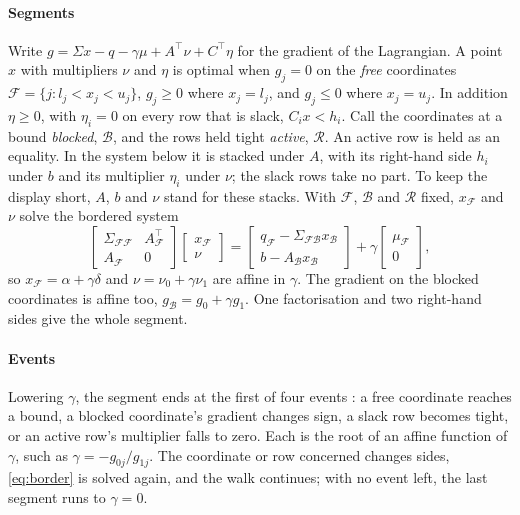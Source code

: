\documentclass[11pt]{article}
\theoremstyle{remark}
\newcommand{\trans}{^{\top}}
\newcommand{\Sig}{\Sigma}
\newcommand{\F}{\mathcal{F}}
\newcommand{\B}{\mathcal{B}}
\begin{document}
\paragraph{Segments} Write
$g=\Sig x-q-\gamma\mu+A\trans\nu+C\trans\eta$ for the gradient of the Lagrangian. A point
$x$ with multipliers $\nu$ and $\eta$ is optimal when $g_j=0$ on the \emph{free}
coordinates $\F=\{j:l_j<x_j<u_j\}$, $g_j\ge0$ where $x_j=l_j$, and $g_j\le0$ where
$x_j=u_j$. In addition $\eta\ge0$, with $\eta_i=0$ on every row that is slack,
$C_ix<h_i$. Call the coordinates at a bound \emph{blocked}, $\B$, and the rows held
tight \emph{active}, $\mathcal{R}$. An active row is held as an equality. In the system
below it is stacked under $A$, with its right-hand side $h_i$ under $b$ and its
multiplier $\eta_i$ under $\nu$; the slack rows take no part. To keep the display short, $A$,
$b$ and $\nu$ stand for these stacks. With $\F$, $\B$ and $\mathcal{R}$ fixed, $x_\F$
and $\nu$ solve the bordered system
\begin{equation}
\label{eq:border}
\begin{bmatrix}\Sig_{\F\F}&A_\F\trans\\A_\F&0\end{bmatrix}
\begin{bmatrix}x_\F\\\nu\end{bmatrix}
=\begin{bmatrix}q_\F-\Sig_{\F\B}x_\B\\b-A_\B x_\B\end{bmatrix}
+\gamma\begin{bmatrix}\mu_\F\\0\end{bmatrix},
\end{equation}
so $x_\F=\alpha+\gamma\delta$ and $\nu=\nu_0+\gamma\nu_1$ are affine in $\gamma$. The
gradient on the blocked coordinates is affine too, $g_\B=g_0+\gamma g_1$. One
factorisation and two right-hand sides give the whole segment.

\paragraph{Events} Lowering $\gamma$, the segment ends at the first of four events
\cite[Section~2.1]{perspective}: a free coordinate reaches a bound, a blocked
coordinate's gradient changes sign, a slack row becomes tight, or an active row's
multiplier falls to zero. Each is the root of an affine function of $\gamma$, such as
$\gamma=-g_{0j}/g_{1j}$. The coordinate or row concerned changes sides,
\eqref{eq:border} is solved again, and the walk continues; with no event left, the last
segment runs to $\gamma=0$.
\end{document}
